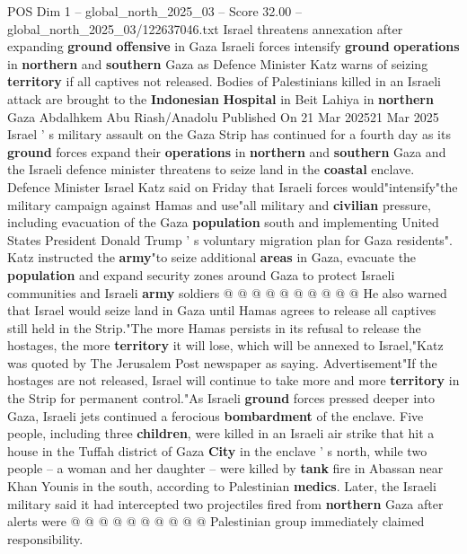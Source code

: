 \begin{textsample}{POS Dim 1 – global\_north\_2025\_03 – Score 32.00 – global\_north\_2025\_03/122637046.txt}  \label{ex:f1_pos_395}
Israel threatens annexation after expanding \textbf{ground} \textbf{offensive} in Gaza Israeli forces intensify \textbf{ground} \textbf{operations} in \textbf{northern} and \textbf{southern} Gaza as Defence Minister Katz warns of seizing \textbf{territory} if all captives not released.
Bodies of Palestinians killed in an Israeli attack are brought to the \textbf{Indonesian} \textbf{Hospital} in Beit Lahiya in \textbf{northern} Gaza Abdalhkem Abu Riash/Anadolu Published On 21 Mar 202521 Mar 2025 Israel ' s military assault on the Gaza Strip has continued for a fourth day as its \textbf{ground} forces expand their \textbf{operations} in \textbf{northern} and \textbf{southern} Gaza and the Israeli defence minister threatens to seize land in the \textbf{coastal} enclave.
Defence Minister Israel Katz said on Friday that Israeli forces would"intensify"the military campaign against Hamas and use"all military and \textbf{civilian} pressure, including evacuation of the Gaza \textbf{population} south and implementing United States President Donald Trump ' s voluntary migration plan for Gaza residents".
Katz instructed the \textbf{army}"to seize additional \textbf{areas} in Gaza, evacuate the \textbf{population} and expand security zones around Gaza to protect Israeli communities and Israeli \textbf{army} soldiers @ @ @ @ @ @ @ @ @ @ He also warned that Israel would seize land in Gaza until Hamas agrees to release all captives still held in the Strip."The more Hamas persists in its refusal to release the hostages, the more \textbf{territory} it will lose, which will be annexed to Israel,"Katz was quoted by The Jerusalem Post newspaper as saying.
Advertisement"If the hostages are not released, Israel will continue to take more and more \textbf{territory} in the Strip for permanent control."As Israeli \textbf{ground} forces pressed deeper into Gaza, Israeli jets continued a ferocious \textbf{bombardment} of the enclave.
Five people, including three \textbf{children}, were killed in an Israeli air strike that hit a house in the Tuffah district of Gaza \textbf{City} in the enclave ' s north, while two people -- a woman and her daughter -- were killed by \textbf{tank} fire in Abassan near Khan Younis in the south, according to Palestinian \textbf{medics}.
Later, the Israeli military said it had intercepted two projectiles fired from \textbf{northern} Gaza after alerts were @ @ @ @ @ @ @ @ @ @ Palestinian group immediately claimed responsibility.

\end{textsample}
